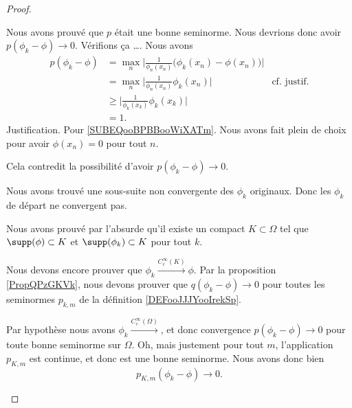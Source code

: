 \begin{proof}
\begin{subproof}
		Nous avons prouvé que \( p\) était une bonne seminorme. Nous devrions donc avoir \( p(\phi_k-\phi)\to 0\). Vérifions ça \ldots. Nous avons
		\begin{subequations}
			\begin{align}
				p(\phi_k-\phi) & =\max_n\big| \frac{1}{ \phi_n(x_n)}\big( \phi_k(x_n)-\phi(x_n) \big) \big|                                                 \\
				               & =\max_n\big| \frac{1}{ \phi_n(x_n)}\phi_k(x_n) \big|                       & \text{cf. justif.}	\label{SUBEQooBPBBooWiXATm} \\
				               & \geq \big| \frac{1}{ \phi_k(x_k)}\phi_k(x_k) \big|                                                                         \\
				               & = 1.
			\end{align}
		\end{subequations}
		Justification. Pour \eqref{SUBEQooBPBBooWiXATm}. Nous avons fait plein de choix pour avoir \( \phi(x_n)=0\) pour tout \( n\).

		Cela contredit la possibilité d'avoir \( p(\phi_k-\phi)\to 0\).

		\spitem[Précision]

		Nous avons trouvé une sous-suite non convergente des \( \phi_k\) originaux. Donc les \( \phi_k\) de départ ne convergent pas.


		Nous avons prouvé par l'absurde qu'il existe un compact \( K\subset \Omega\) tel que \( \supp(\phi)\subset K\) et \( \supp(\phi_k)\subset K\) pour tout \( k\).

		Nous devons encore prouver que \( \phi_k\stackrel{ C^{\infty}_c(K)}{\longrightarrow} \phi\). Par la proposition \ref{PropQPzGKVk}, nous devons prouver que \( q(\phi_k-\phi)\to 0\) pour toutes les seminormes \( p_{k,m}\) de la définition \ref{DEFooJJJYooIrekSp}.

		Par hypothèse nous avons \( \phi_k\stackrel{ C^{\infty}_c(\Omega)}{\longrightarrow} \), et donc convergence \( p(\phi_k-\phi)\to 0\) pour toute bonne seminorme sur \( \Omega\). Oh, mais justement pour tout \( m\), l'application \( p_{K,m}\) est continue, et donc est une bonne seminorme. Nous avons donc bien
		\begin{equation}
			p_{K,m}(\phi_k-\phi)\to 0.
		\end{equation}
	\end{subproof}


\end{proof}
